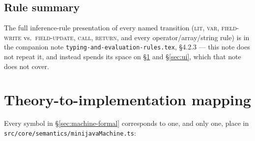 \documentclass[11pt]{article}
\newcommand{\rulename}[1]{\textsc{#1}}
\begin{document}
\subsection{Rule summary}
\label{sec:rule-summary}

The full inference-rule presentation of every named transition
(\rulename{lit}, \rulename{var}, \rulename{field-write} vs.\
\rulename{field-update}, \rulename{call}, \rulename{return}, and every
operator/array/string rule) is in the companion note
\texttt{typing-and-evaluation-rules.tex}, \S4.2.3 --- this note does not
repeat it, and instead spends its space on \S\ref{sec:impl} and
\S\ref{sec:ui}, which that note does not cover.

\section{Theory-to-implementation mapping}
\label{sec:impl}

Every symbol in \S\ref{sec:machine-formal} corresponds to one, and only
one, place in \texttt{src/core/semantics/minijavaMachine.ts}:
\end{document}
